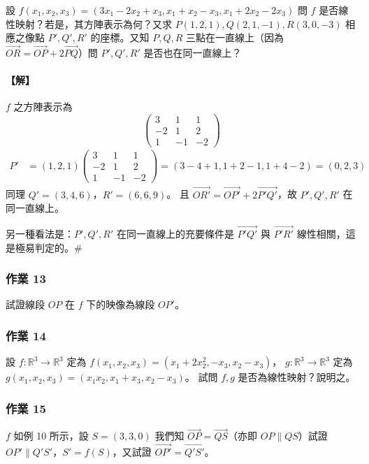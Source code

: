 \begin{example}\label{ex:b6-1-10}
設 $f(x_1, x_2, x_3) = (3x_1 - 2x_2 + x_3, x_1 + x_2 - x_3, x_1 + 2x_2 - 2x_3)$ 問 $f$ 是否線性映射？若是，其方陣表示為何？又求 $P(1, 2, 1), Q(2, 1, -1), R(3, 0, -3)$ 相應之像點 $P', Q', R'$ 的座標。又知 $P, Q, R$ 三點在一直線上（因為 $\vec{OR} = \vec{OP} + 2\vec{PQ}$）問 $P', Q', R'$ 是否也在同一直線上？
\end{example}

\paragraph{【解】}
$f$ 之方陣表示為
\[ \begin{pmatrix} 3 & 1 & 1 \\ -2 & 1 & 2 \\ 1 & -1 & -2 \end{pmatrix} \]
\begin{align*}
P' &= (1, 2, 1) \begin{pmatrix} 3 & 1 & 1 \\ -2 & 1 & 2 \\ 1 & -1 & -2 \end{pmatrix} = (3-4+1, 1+2-1, 1+4-2) = (0, 2, 3)
\end{align*}
同理 $Q' = (3, 4, 6)$，$R' = (6, 6, 9)$。
且 $\vec{OR'} = \vec{OP'} + 2\vec{P'Q'}$，故 $P', Q', R'$ 在同一直線上。

另一種看法是：$P', Q', R'$ 在同一直線上的充要條件是 $\vec{P'Q'}$ 與 $\vec{P'R'}$ 線性相關，這是極易判定的。\hfill$\#$

\subsubsection*{作業 13}\label{hw:b6-1-13}
試證線段 $OP$ 在 $f$ 下的映像為線段 $OP'$。

\subsubsection*{作業 14}\label{hw:b6-1-14}
設 $f: \mathbb{R}^3 \longrightarrow \mathbb{R}^3$ 定為 $f(x_1, x_2, x_3) = (x_1 + 2x_2^2, -x_3, x_2 - x_3)$，
$g: \mathbb{R}^3 \longrightarrow \mathbb{R}^3$ 定為 $g(x_1, x_2, x_3) = (x_1 x_2, x_1 + x_3, x_2 - x_3)$。
試問 $f, g$ 是否為線性映射？說明之。

\subsubsection*{作業 15}\label{hw:b6-1-15}
$f$ 如例 10 所示，設 $S=(3, 3, 0)$ 我們知 $\vec{OP} = \vec{QS}$（亦即 $OP \parallel QS$）試證 $OP' \parallel Q'S'$，$S'=f(S)$，又試證 $\vec{OP'} = \vec{Q'S'}$。

